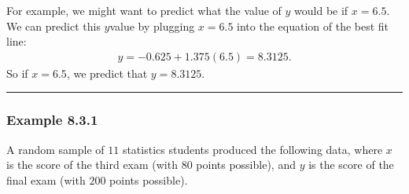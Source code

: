 \documentclass[letterpaper,10pt,english]{jupyterBook}
\begin{document}
\sphinxAtStartPar
For example, we might want to predict what the value of \(y\) would be if \(x = 6.5\). We can predict this \(y\)\sphinxhyphen{}value by plugging \(x = 6.5\) into the equation of the best fit line:
\begin{equation*}
\begin{split} y = -0.625 + 1.375(6.5) = 8.3125. \end{split}
\end{equation*}
\sphinxAtStartPar
So if \(x = 6.5\), we predict that \(y = 8.3125\).


\bigskip\hrule\bigskip



\subsubsection{Example 8.3.1}
\label{\detokenize{Ch8 Correlation and Linear Regression/8.3 The Regression Equation:example-8-3-1}}
\sphinxAtStartPar
A random sample of \(11\) statistics students produced the following data, where \(x\) is the score of the third exam (with \(80\) points possible), and \(y\) is the score of the final exam (with \(200\) points possible).
\end{document}
